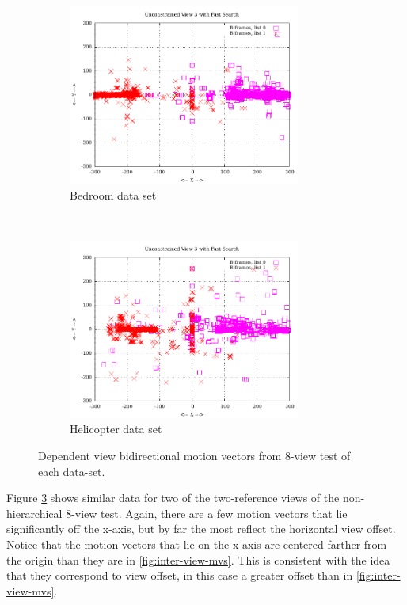 \documentclass{sig-alternate-05-2015}
\begin{document}
\begin{figure}[H]
\centering
\begin{subfigure}{.5\textwidth}
\centering
\includegraphics[width=3in]{figures/bedroom1-inter-view-bimvs1.pdf}
\caption{Bedroom data set}
\label{fig:bedroom-inter-view-bimvs1}
\end{subfigure} \\
\begin{subfigure}{.5\textwidth}
\centering
\includegraphics[width=3in]{figures/helicopter-inter-view-bimvs1.pdf}
\caption{Helicopter data set}
\label{fig:helicopter-inter-view-bimvs1}
\end{subfigure}
\caption{Dependent view bidirectional motion vectors from 8-view test of each
data-set.}
\label{fig:inter-view-bimvs1}
\end{figure}

Figure \ref{fig:inter-view-bimvs1} shows similar data for two of the
two-reference views of the non-hierarchical 8-view test. Again, there are a few
motion vectors that lie significantly off the x-axis, but by far the most reflect
the horizontal view offset. Notice that the motion vectors that lie on the x-axis
are centered farther from the origin than they are in \ref{fig:inter-view-mvs}.
This is consistent with the idea that they correspond to view offset, in this
case a greater offset than in \ref{fig:inter-view-mvs}.
\end{document}
